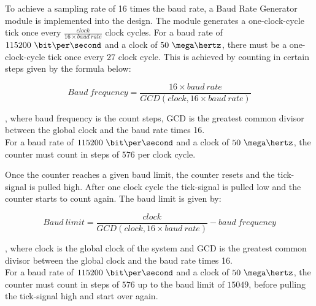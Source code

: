 \documentclass[main.tex]{subfiles}
\begin{document}
To achieve a sampling rate of 16 times the baud rate, a Baud Rate Generator module is implemented into the design. The module generates a one-clock-cycle tick once every $\frac{clock}{16 \times baud\ rate}$ clock cycles. For a baud rate of $115200\ \bit\per\second$ and a clock of $50\ \mega\hertz$, there must be a one-clock-cycle tick once every $27$ clock cycle. This is achieved by counting in certain steps given by the formula below:

\begin{equation}
Baud\ frequency = \frac{16 \times baud\ rate}{GCD(clock, 16 \times baud\ rate)}
\end{equation}

, where baud frequency is the count steps, GCD is the greatest common divisor between the global clock and the baud rate times 16. \cite{velure10} \\
For a baud rate of $115200\ \bit\per\second$ and a clock of $50\ \mega\hertz$, the counter must count in steps of $576$ per clock cycle. 

Once the counter reaches a given baud limit, the counter resets and the tick-signal is pulled high. After one clock cycle the tick-signal is pulled low and the counter starts to count again. The baud limit is given by:

\begin{equation}
Baud\ limit= \frac{clock}{GCD(clock, 16 \times baud\ rate)} - baud\ frequency
\end{equation}

, where clock is the global clock of the system and GCD is the greatest common divisor between the global clock and the baud rate times 16. \cite{velure10} \\
For a baud rate of $115200\ \bit\per\second$ and a clock of $50\ \mega\hertz$, the counter must count in steps of $576$ up to the baud limit of $15049$, before pulling the tick-signal high and start over again. 
\end{document}
